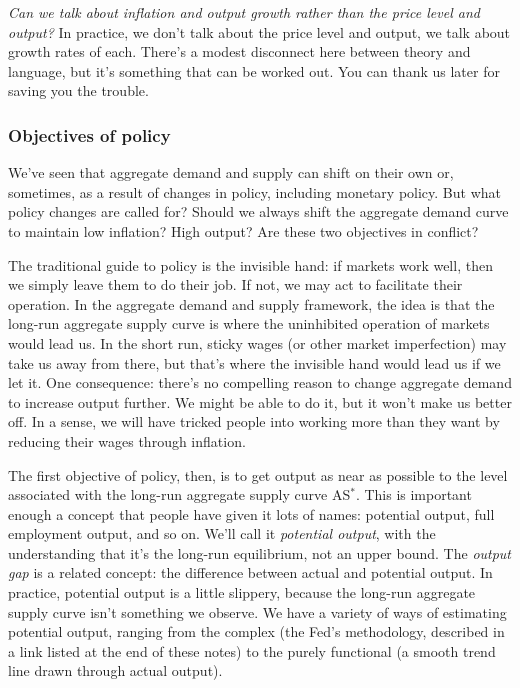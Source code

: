 \documentclass[letterpaper,12pt]{article}
\begin{document}
{\it Can we talk about inflation and output growth 
rather than the price level and output?\/}
In practice, we don't talk about the price level and output, 
we talk about growth rates of each.  
There's a modest disconnect here between theory and language, 
but it's something that can be worked out.  
You can thank us later for saving you the trouble.  


\subsubsection*{Objectives of policy} 

We've seen that aggregate demand and supply can shift on their own or, 
sometimes, as a result of changes in policy,
including monetary policy.  
But what policy changes are called for?  
Should we always shift the aggregate demand curve to maintain 
low inflation?  High output? 
Are these two objectives in conflict?   


The traditional guide to policy is the invisible hand:
if markets work well, then we simply leave them to do their job.
If not, we may act to facilitate their operation.
In the aggregate demand and supply framework, 
the idea is that the long-run aggregate supply curve 
is where the uninhibited operation of markets would lead us.
In the short run, sticky wages (or other market imperfection) 
may take us away from there, but that's 
where the invisible hand would lead us if we let it. 
One consequence:   there's no 
compelling reason to change aggregate demand
to increase output further.
We might be able to do it, but it won't make us better off.  
In a sense, we will have tricked people into working more than they 
want by reducing their wages through inflation. 

The first objective of policy, then, 
is to get output as near as possible to 
the level associated with the long-run 
aggregate supply curve AS$^*$.  
This is important enough a concept that people have given it 
lots of names:  potential output, full employment output, and so on.
We'll call it {\it potential output\/}, with the understanding that it's 
the long-run equilibrium, not an upper bound.  
The {\it output gap\/} is a related concept:
the difference between actual and potential output.  
In practice, potential output is a little slippery,
because the long-run aggregate supply curve 
isn't something we observe.  
We have a variety of ways of estimating potential output, 
ranging from the complex (the Fed's methodology, described
in a link listed at the end of these notes) to 
the purely functional (a smooth trend line drawn through actual output).  
\end{document}

